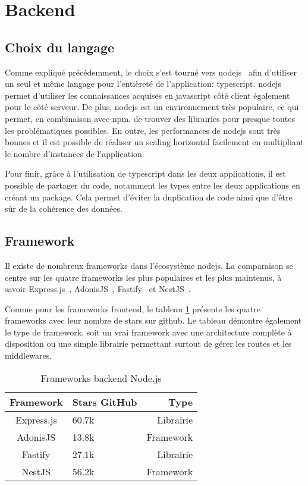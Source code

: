 \section{Backend}

\subsection{Choix du langage}

Comme expliqué précédemment, le choix s'est tourné vers \gls{nodejs}~\cite{nodejs} afin d'utiliser un seul et même langage pour l'entièreté de l'application: \gls{typescript}. \gls{nodejs} permet d'utiliser les connaissances acquises en \gls{javascript} côté client également pour le côté serveur. De plus, \gls{nodejs} est un environnement très populaire, ce qui permet, en combinaison avec \gls{npm}, de trouver des librairies pour presque toutes les problématiques possibles. En outre, les performances de \gls{nodejs} sont très bonnes et il est possible de réaliser un scaling horizontal facilement en multipliant le nombre d'instances de l'application.

Pour finir, grâce à l'utilisation de \gls{typescript} dans les deux applications, il est possible de partager du code, notamment les types entre les deux applications en créant un package. Cela permet d'éviter la duplication de code ainsi que d'être sûr de la cohérence des données.

\subsection{Framework}

Il existe de nombreux frameworks dans l'écosystème \gls{nodejs}. La comparaison se centre sur les quatre frameworks les plus populaires et les plus maintenus, à savoir Express.js~\cite{expressjs}, AdonisJS~\cite{adonisjs}, Fastify~\cite{fastify} et NestJS~\cite{nestjs}.

Comme pour les frameworks frontend, le tableau \ref{tab:frameworks-backend-nodejs} présente les quatre frameworks avec leur nombre de stars sur \gls{github}. Le tableau démontre également le type de framework, soit un vrai framework avec une architecture complète à disposition ou une simple librairie permettant surtout de gérer les routes et les middlewares.

\begin{table}[h]
  \begin{center}
    \caption{Frameworks backend Node.js}
    \label{tab:frameworks-backend-nodejs}
    \begin{tabular}{c|l|r}
      Framework  & Stars GitHub & Type      \\ \hline
      Express.js & 60.7k        & Librairie \\
      AdonisJS   & 13.8k        & Framework \\
      Fastify    & 27.1k        & Librairie \\
      NestJS     & 56.2k        & Framework \\
    \end{tabular}
  \end{center}
\end{table}

